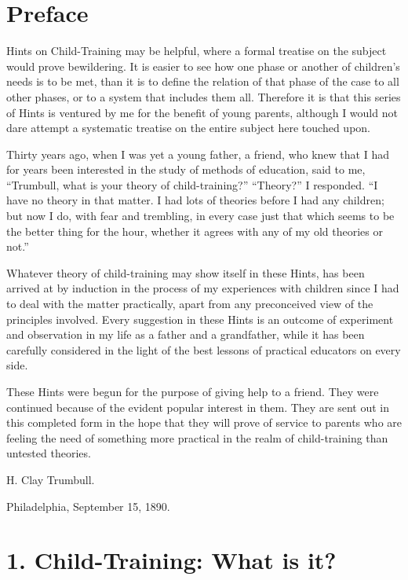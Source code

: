 \documentclass[
]{book}
\begin{document}
\clearpage
\setcounter{page}{1}

\hypertarget{preface}{%
\chapter*{Preface}\label{preface}}

Hints on Child-Training may be helpful, where a formal treatise on the subject would prove bewildering. It is easier to see how one phase or another of children's needs is to be met, than it is to define the relation of that phase of the case to all other phases, or to a system that includes them all. Therefore it is that this series of Hints is ventured by me for the benefit of young parents, although I would not dare attempt a systematic treatise on the entire subject here touched upon.

Thirty years ago, when I was yet a young father, a friend, who knew that I had for years been interested in the study of methods of education, said to me, ``Trumbull, what is your theory of child-training?'' ``Theory?'' I responded. ``I have no theory in that matter. I had lots of theories before I had any children; but now I do, with fear and trembling, in every case just that which seems to be the better thing for the hour, whether it agrees with any of my old theories or not.''

Whatever theory of child-training may show itself in these Hints, has been arrived at by induction in the process of my experiences with children since I had to deal with the matter practically, apart from any preconceived view of the principles involved. Every suggestion in these Hints is an outcome of experiment and observation in my life as a father and a grandfather, while it has been carefully considered in the light of the best lessons of practical educators on every side.

These Hints were begun for the purpose of giving help to a friend. They were continued because of the evident popular interest in them. They are sent out in this completed form in the hope that they will prove of service to parents who are feeling the need of something more practical in the realm of child-training than untested theories.

H. Clay Trumbull.

Philadelphia, September 15, 1890.

\hypertarget{child-training-what-is-it}{%
\chapter{1. Child-Training: What is it?}\label{child-training-what-is-it}}
\end{document}
